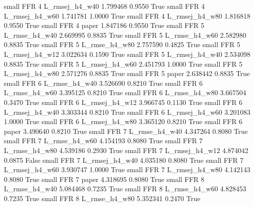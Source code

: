      small      FFR                 4 L_rmsej_h4_w40   1.799468      0.9550    True
     small      FFR                 4 L_rmsej_h4_w60   1.741781      1.0000    True
     small      FFR                 4 L_rmsej_h4_w80   1.816818      0.9550    True
     small      FFR                 4          paper   1.847186      0.9550    True
     small      FFR                 5  L_rmse_h4_w40   2.669995      0.8835    True
     small      FFR                 5  L_rmse_h4_w60   2.582980      0.8835    True
     small      FFR                 5  L_rmse_h4_w80   2.757590      0.4825    True
     small      FFR                 5 L_rmsej_h4_w12   3.022634      0.1590    True
     small      FFR                 5 L_rmsej_h4_w40   2.534098      0.8835    True
     small      FFR                 5 L_rmsej_h4_w60   2.451793      1.0000    True
     small      FFR                 5 L_rmsej_h4_w80   2.571276      0.8835    True
     small      FFR                 5          paper   2.638442      0.8835    True
     small      FFR                 6  L_rmse_h4_w40   3.526690      0.8210    True
     small      FFR                 6  L_rmse_h4_w60   3.395125      0.8210    True
     small      FFR                 6  L_rmse_h4_w80   3.667504      0.3470    True
     small      FFR                 6 L_rmsej_h4_w12   3.966745      0.1130    True
     small      FFR                 6 L_rmsej_h4_w40   3.303344      0.8210    True
     small      FFR                 6 L_rmsej_h4_w60   3.201083      1.0000    True
     small      FFR                 6 L_rmsej_h4_w80   3.365120      0.8210    True
     small      FFR                 6          paper   3.490640      0.8210    True
     small      FFR                 7  L_rmse_h4_w40   4.347264      0.8080    True
     small      FFR                 7  L_rmse_h4_w60   4.154193      0.8080    True
     small      FFR                 7  L_rmse_h4_w80   4.539186      0.2930    True
     small      FFR                 7 L_rmsej_h4_w12   4.874042      0.0875   False
     small      FFR                 7 L_rmsej_h4_w40   4.035180      0.8080    True
     small      FFR                 7 L_rmsej_h4_w60   3.930747      1.0000    True
     small      FFR                 7 L_rmsej_h4_w80   4.142143      0.8080    True
     small      FFR                 7          paper   4.318695      0.8080    True
     small      FFR                 8  L_rmse_h4_w40   5.084468      0.7235    True
     small      FFR                 8  L_rmse_h4_w60   4.828453      0.7235    True
     small      FFR                 8  L_rmse_h4_w80   5.352341      0.2470    True
